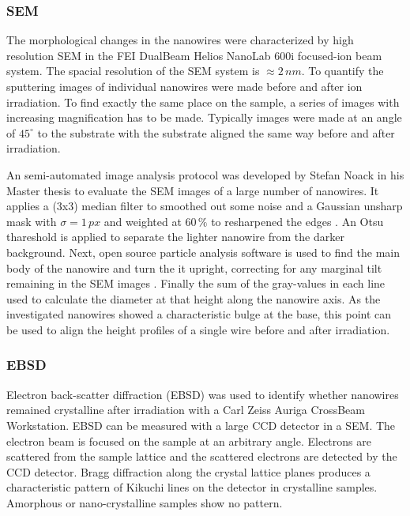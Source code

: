 \subsubsection{SEM}

The morphological changes in the nanowires were characterized by high resolution SEM in the FEI DualBeam Helios NanoLab 600i focused-ion beam system. The spacial resolution of the SEM system is $\approx 2\,nm$. To quantify the sputtering images of individual nanowires were made before and after ion irradiation. To find exactly the same place on the sample, a series of images with increasing magnification has to be made. Typically images were made at an angle of $45^\circ$ to the substrate with the substrate aligned the same way before and after irradiation.

An semi-automated image analysis protocol was developed by Stefan Noack in his Master thesis \cite{noack_sputter_2014, NL} to evaluate the SEM images of a large number of nanowires. It applies a (3x3) median filter to smoothed out some noise and a Gaussian unsharp mask with $\sigma = 1\,px$ and weighted at $60\,\%$ to resharpened the edges \cite{sankur_survey_2004}. An Otsu thareshold \cite{otsu_threshold_1979} is applied to separate the lighter nanowire from the darker background. Next, open source particle analysis software is used to find the main body of the nanowire and turn the it upright, correcting for any marginal tilt remaining in the SEM images \cite{schindelin_fiji:_2012,sage_imagej_2012}. Finally the sum of the gray-values in each line used to calculate the diameter at that height along the nanowire axis. As the investigated nanowires showed a characteristic bulge at the base, this point can be used to align the height profiles of a single wire before and after irradiation.

\subsubsection{EBSD}

Electron back-scatter diffraction (EBSD) was used to identify whether nanowires remained crystalline after irradiation with a Carl Zeiss Auriga CrossBeam Workstation. EBSD can be measured with a large CCD detector in a SEM. The electron beam is focused on the sample at an arbitrary angle. Electrons are scattered from the sample lattice and the scattered electrons are detected by the CCD detector. Bragg diffraction along the crystal lattice planes produces a characteristic pattern of Kikuchi lines on the detector \cite{kikuchi_diffraction_1928,fultz_transmission_2013} in crystalline samples. Amorphous or nano-crystalline samples show no pattern.

